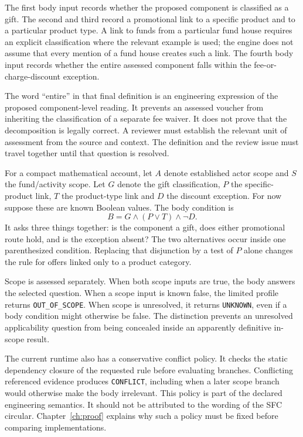 \documentclass[12pt,a4paper,oneside,openany]{book}
\begin{document}
The first body input records whether the proposed component is classified as a
gift. The second and third record a promotional link to a specific product and
to a particular product type. A link to funds from a particular fund house
requires an explicit classification where the relevant example is used; the
engine does not assume that every mention of a fund house creates such a link.
The fourth body input records whether the entire assessed component falls
within the fee-or-charge-discount exception.

The word ``entire'' in that final definition is an engineering expression of
the proposed component-level reading. It prevents an assessed voucher from
inheriting the classification of a separate fee waiver. It does not prove that
the decomposition is legally correct. A reviewer must establish the relevant
unit of assessment from the source and context. The definition and the review
issue must travel together until that question is resolved.

For a compact mathematical account, let $A$ denote established actor scope and
$S$ the fund/activity scope. Let $G$ denote the gift classification, $P$ the
specific-product link, $T$ the product-type link and $D$ the discount exception.
For now suppose these are known Boolean values. The body condition is
\begin{equation}
 B=G\land(P\lor T)\land\neg D.
 \label{eq:gift-body}
\end{equation}
It asks three things together: is the component a gift, does either promotional
route hold, and is the exception absent? The two alternatives occur inside one
parenthesized condition. Replacing that disjunction by a test of $P$ alone
changes the rule for offers linked only to a product category.

Scope is assessed separately. When both scope inputs are true, the body answers
the selected question. When a scope input is known false, the limited profile
returns \texttt{OUT\_OF\_SCOPE}. When scope is unresolved, it returns
\texttt{UNKNOWN}, even if a body condition might otherwise be false. The
distinction prevents an unresolved applicability question from being concealed
inside an apparently definitive in-scope result.

The current runtime also has a conservative conflict policy. It checks the
static dependency closure of the requested rule before evaluating branches.
Conflicting referenced evidence produces \texttt{CONFLICT}, including when a
later scope branch would otherwise make the body irrelevant. This policy is
part of the declared engineering semantics. It should not be attributed to the
wording of the SFC circular. Chapter~\ref{ch:proof} explains why such a policy
must be fixed before comparing implementations.
\end{document}
